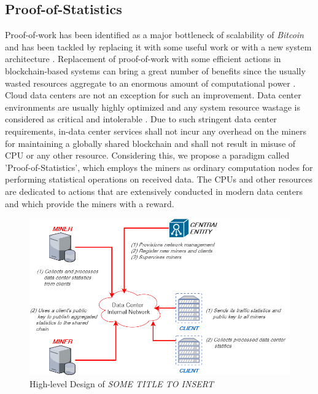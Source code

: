 \documentclass{article}
\newcommand{\projTitle}{SOME TITLE TO INSERT\xspace}
\begin{document}
\subsection{Proof-of-Statistics}
\label{sec:proof-of-statistics}
Proof-of-work has been identified as a major bottleneck of scalability of \textit{Bitcoin}  and has been tackled by replacing it with some useful work \cite{filecoin-storage} or with a new system architecture \cite{RSCoin-bank}.  Replacement of proof-of-work with some
efficient actions in blockchain-based systems can bring a great number of benefits since the usually wasted resources aggregate to an enormous amount of  computational power \cite{bitcoin-comp-elec-power}. Cloud data centers are not an exception for such an
improvement. Data center environments are usually highly optimized and any system resource wastage is considered as critical and intolerable \cite{google-ai-power, facebook-cold-storage-rack}. Due to such stringent data center requirements, in-data center services
shall not incur any overhead on the miners for maintaining a globally shared blockchain and shall not result in misuse of CPU or any other resource. Considering this, we propose a paradigm called 'Proof-of-Statistics', which employs the miners as ordinary computation nodes
for performing statistical operations on received data. The CPUs and other resources are dedicated to actions that are extensively conducted in modern data centers \cite{microsoft-autopilot} and which provide the miners with a reward.

\begin{figure}[h!]
  \includegraphics[width=0.6\linewidth]{figures/project_design.png}
  \caption{High-level Design of \textit{\projTitle}}
  \label{fig:project_design}
\end{figure}
\end{document}
